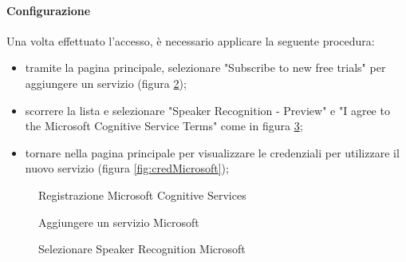 \paragraph{Configurazione}
Una volta effettuato l'accesso, è necessario applicare la seguente procedura:
\begin{itemize}
	\item tramite la pagina principale, selezionare "Subscribe to new free trials" per aggiungere un servizio (figura \ref{fig:addMicrosoft});
	\item scorrere la lista e selezionare "Speaker Recognition - Preview" e "I agree to the Microsoft Cognitive Service Terms" come in figura \ref{fig:speakerRec};
	\item tornare nella pagina principale per visualizzare le credenziali per utilizzare il nuovo servizio (figura \ref{fig:credMicrosoft});
\end{itemize}
\begin{figure}[h]
	\caption{Registrazione Microsoft Cognitive Services}\label{fig:microsoft}
\end{figure}
\begin{figure}[h]
	\caption{Aggiungere un servizio Microsoft}\label{fig:addMicrosoft}
\end{figure}
\begin{figure}[h]
	\caption{Selezionare Speaker Recognition Microsoft}\label{fig:speakerRec}
\end{figure}
